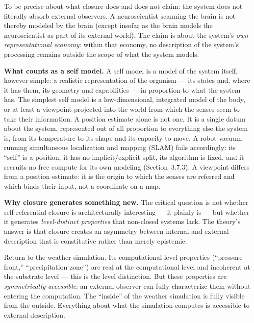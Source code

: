 \documentclass[12pt]{article}
\begin{document}
{To be precise about what closure does and does not claim: the system does not literally absorb external observers. A neuroscientist scanning the brain is not thereby modeled by the brain (except insofar as the brain models the neuroscientist as part of its external world). The claim is about the system's \emph{own representational economy}: within that economy, no description of the system's processing remains outside the scope of what the system models.

\textbf{What counts as a self model.} A self model is a model of the system itself, however simple: a realistic representation of the organism --- its states and, where it has them, its geometry and capabilities --- in proportion to what the system has. The simplest self model is a low-dimensional, integrated model of the body, or at least a viewpoint projected into the world from which the senses seem to take their information. A position estimate alone is not one. It is a single datum about the system, represented out of all proportion to everything else the system is, from its temperature to its shape and its capacity to move. A robot vacuum running simultaneous localization and mapping (SLAM) fails accordingly: its ``self'' is a position, it has no implicit/explicit split, its algorithm is fixed, and it recruits no free compute for its own modeling (Section~3.7.3). A viewpoint differs from a position estimate: it is the origin to which the senses are referred and which binds their input, not a coordinate on a map.

\textbf{Why closure generates something new.} The critical question is not whether self-referential closure is architecturally interesting --- it plainly is --- but whether it generates \emph{level-distinct properties} that non-closed systems lack. The theory's answer is that closure creates an asymmetry between internal and external description that is constitutive rather than merely epistemic.

Return to the weather simulation. Its computational-level properties (``pressure front,'' ``precipitation zone'') are real at the computational level and incoherent at the substrate level --- this is the level distinction. But these properties are \emph{symmetrically accessible}: an external observer can fully characterize them without entering the computation. The ``inside'' of the weather simulation is fully visible from the outside. Everything about what the simulation computes is accessible to external description.

}
\end{document}

